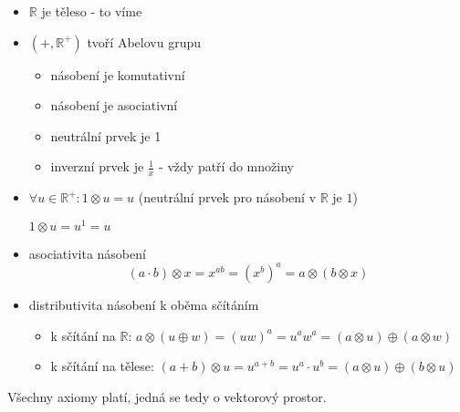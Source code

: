 \documentclass[10pt,a4paper]{article}
\begin{document}
\begin{itemize}
	\item $\mathbb{R}$ je těleso - to víme
	\item $(+, \mathbb{R}^+)$ tvoří Abelovu grupu
	
	
	\begin{itemize}
		\item násobení je komutativní
		\item násobení je asociativní
		\item neutrální prvek je 1
		\item inverzní prvek je $\frac1x$ - vždy patří do množiny
	\end{itemize}
	\item $\forall u \in \mathbb{R}^+: 1 \otimes u = u$ (neutrální prvek pro násobení v $\mathbb{R}$ je $1$)
	
	$ 1 \otimes u = u^1 = u$
	\item asociativita násobení
	\begin{equation*}
	(a \cdot b) \otimes x = x^{ab} = (x^b)^a = a \otimes (b \otimes x) 
	\end{equation*}
	\item distributivita násobení k oběma sčítáním
	\begin{itemize}
		\item k sčítání na $\mathbb{R}$: $a \otimes (u \oplus w) = (uw)^a = u^aw^a = (a\otimes u) \oplus (a \otimes w) $
		\item k sčítání na tělese:
			$(a + b) \otimes u = u^{a+b}= u^a \cdot u^b = (a \otimes u)\oplus (b \otimes u)$
	\end{itemize}
	
\end{itemize}

Všechny axiomy platí, jedná se tedy o vektorový prostor.
\end{document}
